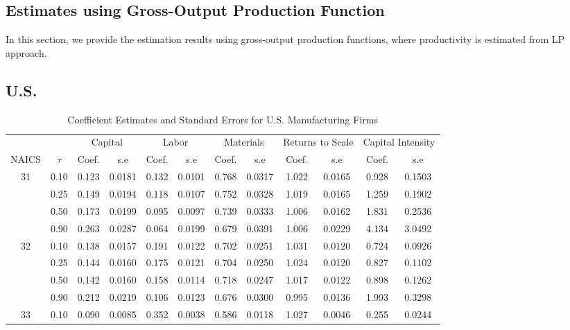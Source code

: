 \documentclass[12pt]{article}
\begin{document}
\begin{appendices}
\newpage

\section{Estimates using Gross-Output Production Function} \label{gross}
In this section, we provide the estimation results using gross-output production functions, where productivity is estimated from LP approach.

\subsection{U.S.}

\begin{table}[H]
\centering
\caption{Coefficient Estimates and Standard Errors for U.S. Manufacturing Firms}
\small
\begin{tabular}{cccccccccccc}
  \hline\hline & & \multicolumn{2}{c}{Capital}  & \multicolumn{2}{c}{Labor} & \multicolumn{2}{c}{Materials} & \multicolumn{2}{c}{Returns to Scale} & \multicolumn{2}{c}{Capital Intensity}\\ \cmidrule(lr){3-4} \cmidrule(lr){5-6} \cmidrule(lr){7-8} \cmidrule(lr){9-10} \cmidrule(lr){11-12}NAICS & $\tau$ & Coef. & s.e & Coef. & s.e & Coef. & s.e & Coef. & s.e & Coef. & s.e \\ 
  \hline
31 & 0.10 & 0.123 & 0.0181 & 0.132 & 0.0101 & 0.768 & 0.0317 & 1.022 & 0.0165 & 0.928 & 0.1503 \\ 
   & 0.25 & 0.149 & 0.0194 & 0.118 & 0.0107 & 0.752 & 0.0328 & 1.019 & 0.0165 & 1.259 & 0.1902 \\ 
   & 0.50 & 0.173 & 0.0199 & 0.095 & 0.0097 & 0.739 & 0.0333 & 1.006 & 0.0162 & 1.831 & 0.2536 \\ 
   & 0.90 & 0.263 & 0.0287 & 0.064 & 0.0199 & 0.679 & 0.0391 & 1.006 & 0.0229 & 4.134 & 3.0492 \\ 
  32 & 0.10 & 0.138 & 0.0157 & 0.191 & 0.0122 & 0.702 & 0.0251 & 1.031 & 0.0120 & 0.724 & 0.0926 \\ 
   & 0.25 & 0.144 & 0.0160 & 0.175 & 0.0121 & 0.704 & 0.0250 & 1.024 & 0.0120 & 0.827 & 0.1102 \\ 
   & 0.50 & 0.142 & 0.0160 & 0.158 & 0.0114 & 0.718 & 0.0247 & 1.017 & 0.0122 & 0.898 & 0.1262 \\ 
   & 0.90 & 0.212 & 0.0219 & 0.106 & 0.0123 & 0.676 & 0.0300 & 0.995 & 0.0136 & 1.993 & 0.3298 \\ 
  33 & 0.10 & 0.090 & 0.0085 & 0.352 & 0.0038 & 0.586 & 0.0118 & 1.027 & 0.0046 & 0.255 & 0.0244 \\ 

\end{tabular}
\end{table}
\end{appendices}
\end{document}
